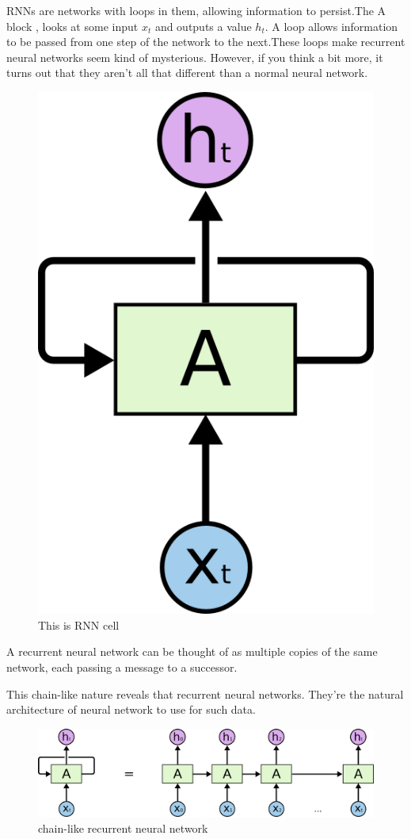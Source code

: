 RNNs are networks with loops in them, allowing information to persist.The A block , looks at some input $x_t$ and outputs a value $h_t$. A loop allows information to be passed from one step of the network to the next.These loops make recurrent neural networks seem kind of mysterious. However, if you think a bit more, it turns out that they aren’t all that different than a normal neural network.
  \begin{figure}[H]%
    \center%
    \includegraphics[width=.3\textwidth]{images/amir/RNN-rolled.png}%
    \caption[This is RNN cell image]{This is RNN cell}\label{fig:RNN cell}%
  \end{figure}
  \indent A recurrent neural network can be thought of as multiple copies of the same network, each passing a message to a successor. 

This chain-like nature reveals that recurrent neural networks. They’re the natural architecture of neural network to use for such data.\\
  \begin{figure}[H]%
    \center%
    \includegraphics[width=\textwidth]{images/amir/RNN1-unrolled.png}%
    \caption[This is RNN net image]{chain-like recurrent neural network}\label{fig:RNN network}%
  \end{figure}
  
